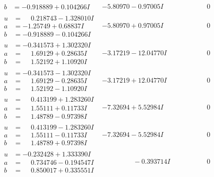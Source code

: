 \documentclass[1p]{elsarticle_modified}
\theoremstyle{definition}
\begin{document}
$$\begin{array}{c|c|c}
\begin{aligned}
b &= -0.918889 + 0.104266 I\end{aligned}
 & -5.80970 - 0.97005 I & \phantom{-0.000000 } 0 \\ \hline\begin{aligned}
u &= \phantom{-}0.218743 - 1.328010 I \\
a &= -1.25749 + 0.68837 I \\
b &= -0.918889 - 0.104266 I\end{aligned}
 & -5.80970 + 0.97005 I & \phantom{-0.000000 } 0 \\ \hline\begin{aligned}
u &= -0.341573 + 1.302320 I \\
a &= \phantom{-}1.69129 + 0.28635 I \\
b &= \phantom{-}1.52192 + 1.10920 I\end{aligned}
 & -3.17219 - 12.04770 I & \phantom{-0.000000 } 0 \\ \hline\begin{aligned}
u &= -0.341573 - 1.302320 I \\
a &= \phantom{-}1.69129 - 0.28635 I \\
b &= \phantom{-}1.52192 - 1.10920 I\end{aligned}
 & -3.17219 + 12.04770 I & \phantom{-0.000000 } 0 \\ \hline\begin{aligned}
u &= \phantom{-}0.413199 + 1.283260 I \\
a &= \phantom{-}1.55111 + 0.11733 I \\
b &= \phantom{-}1.48789 - 0.97398 I\end{aligned}
 & -7.32694 + 5.52984 I & \phantom{-0.000000 } 0 \\ \hline\begin{aligned}
u &= \phantom{-}0.413199 - 1.283260 I \\
a &= \phantom{-}1.55111 - 0.11733 I \\
b &= \phantom{-}1.48789 + 0.97398 I\end{aligned}
 & -7.32694 - 5.52984 I & \phantom{-0.000000 } 0 \\ \hline\begin{aligned}
u &= -0.232428 + 1.333390 I \\
a &= \phantom{-}0.734746 - 0.194547 I \\
b &= \phantom{-}0.850017 + 0.335551 I\end{aligned}
 & \phantom{-0.000000 } -0.393714 I & \phantom{-0.000000 } 0 \\ \hline\begin{aligned}

\end{aligned}
\end{array}$$
\end{document}

